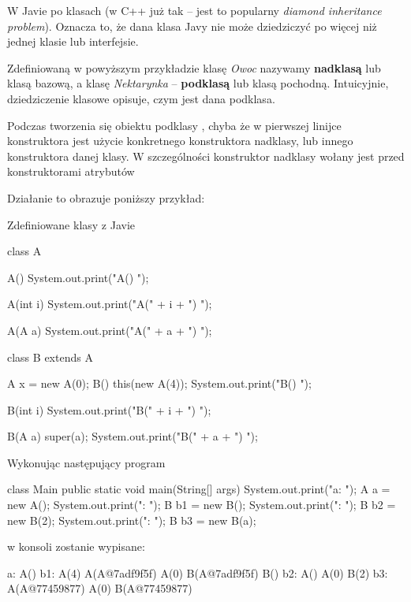 W Javie  po klasach (w C++ już tak -- jest to popularny \textit{diamond inheritance problem}). Oznacza to, że dana klasa Javy nie może dziedziczyć po więcej niż jednej klasie lub interfejsie.

Zdefiniowaną w powyższym przykładzie klasę \textit{Owoc} nazywamy \textbf{nadklasą} lub klasą bazową, a klasę \textit{Nektarynka} -- \textbf{podklasą} lub klasą pochodną. Intuicyjnie, dziedziczenie klasowe opisuje, czym jest dana podklasa.

Podczas tworzenia się obiektu podklasy , chyba że w pierwszej linijce konstruktora jest użycie konkretnego konstruktora nadklasy, lub innego konstruktora danej klasy. W szczególności konstruktor nadklasy wołany jest przed konstruktorami atrybutów

Działanie to obrazuje poniższy przykład:
\begin{example}
Zdefiniowane klasy z Javie
\begin{java}
class A {
    A() {
        System.out.print("A() ");
    }

    A(int i) {
        System.out.print("A(" + i + ") ");
    }

    A(A a) {
        System.out.print("A(" + a + ") ");
    }
}

class B extends A {
    A x = new A(0);
    B() {
        this(new A(4));
        System.out.print("B() ");
    }

    B(int i) {
        System.out.print("B(" + i + ") ");
    }

    B(A a) {
        super(a);
        System.out.print("B(" + a + ") ");
    }

}
\end{java}

Wykonując następujący program
\begin{java}
class Main {
    public static void main(String[] args) {
        System.out.print("a: ");
        A a = new A();
        System.out.print(": ");
        B b1 = new B();
        System.out.print(": ");
        B b2 = new B(2);
        System.out.print(": ");
        B b3 = new B(a);
    }
}
\end{java}
w konsoli zostanie wypisane:
\begin{plain}
a: A() 
b1: A(4) A(A@7adf9f5f) A(0) B(A@7adf9f5f) B() 
b2: A() A(0) B(2) 
b3: A(A@77459877) A(0) B(A@77459877) 
\end{plain}
\end{example}

